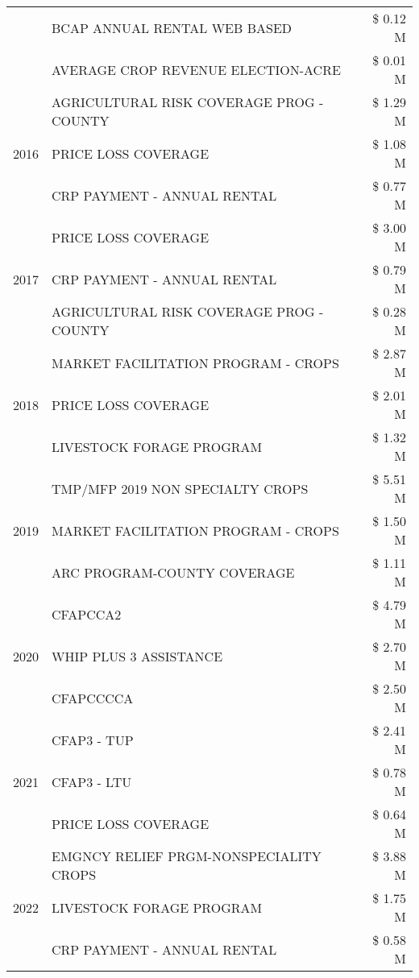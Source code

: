 \begin{tabular}{llr}
 & BCAP ANNUAL RENTAL WEB BASED & \$ 0.12 M \\
 & AVERAGE CROP REVENUE ELECTION-ACRE & \$ 0.01 M \\
\cline{1-3}
\multirow[t]{3}{*}{2016} & AGRICULTURAL RISK COVERAGE PROG - COUNTY & \$ 1.29 M \\
 & PRICE LOSS COVERAGE & \$ 1.08 M \\
 & CRP PAYMENT - ANNUAL RENTAL & \$ 0.77 M \\
\cline{1-3}
\multirow[t]{3}{*}{2017} & PRICE LOSS COVERAGE & \$ 3.00 M \\
 & CRP PAYMENT - ANNUAL RENTAL & \$ 0.79 M \\
 & AGRICULTURAL RISK COVERAGE PROG - COUNTY & \$ 0.28 M \\
\cline{1-3}
\multirow[t]{3}{*}{2018} & MARKET FACILITATION PROGRAM - CROPS & \$ 2.87 M \\
 & PRICE LOSS COVERAGE & \$ 2.01 M \\
 & LIVESTOCK FORAGE PROGRAM & \$ 1.32 M \\
\cline{1-3}
\multirow[t]{3}{*}{2019} & TMP/MFP 2019 NON SPECIALTY CROPS & \$ 5.51 M \\
 & MARKET FACILITATION PROGRAM - CROPS & \$ 1.50 M \\
 & ARC PROGRAM-COUNTY COVERAGE & \$ 1.11 M \\
\cline{1-3}
\multirow[t]{3}{*}{2020} & CFAPCCA2 & \$ 4.79 M \\
 & WHIP PLUS 3 ASSISTANCE & \$ 2.70 M \\
 & CFAPCCCCA & \$ 2.50 M \\
\cline{1-3}
\multirow[t]{3}{*}{2021} & CFAP3 - TUP & \$ 2.41 M \\
 & CFAP3 - LTU & \$ 0.78 M \\
 & PRICE LOSS COVERAGE & \$ 0.64 M \\
\cline{1-3}
\multirow[t]{3}{*}{2022} & EMGNCY RELIEF PRGM-NONSPECIALITY CROPS & \$ 3.88 M \\
 & LIVESTOCK FORAGE PROGRAM & \$ 1.75 M \\
 & CRP PAYMENT - ANNUAL RENTAL & \$ 0.58 M \\
\cline{1-3}
\bottomrule
\end{tabular}
